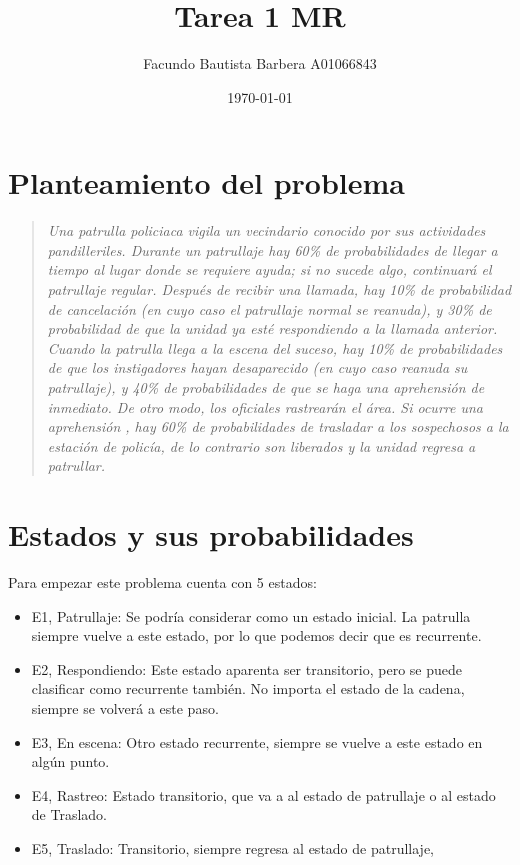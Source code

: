 \documentclass{article}
\title{Tarea 1 MR}
\author{Facundo Bautista Barbera A01066843}
\date{\today}
\begin{document}
\maketitle

\section*{Planteamiento del problema}

\begin{quote}
	\itshape
	Una patrulla policiaca vigila un vecindario conocido por sus actividades pandilleriles.
	Durante un patrullaje hay 60\% de probabilidades  de llegar a tiempo al lugar  donde se requiere ayuda; si no sucede algo, continuará el patrullaje regular.
	Después de recibir una llamada, hay 10\% de probabilidad de cancelación (en cuyo caso el patrullaje normal se reanuda), y 30\% de probabilidad de que la unidad ya esté respondiendo a la llamada anterior.
	Cuando la patrulla llega a la escena del suceso, hay 10\% de probabilidades de que los instigadores hayan desaparecido (en cuyo caso reanuda su patrullaje), y 40\% de probabilidades de que se haga una aprehensión de inmediato.
	De otro modo, los oficiales rastrearán el área.
	Si ocurre una aprehensión , hay 60\% de probabilidades de trasladar a los sospechosos a la estación de policía, de lo contrario son liberados y la unidad regresa a patrullar.
\end{quote}

\section*{Estados y sus probabilidades}

Para empezar este problema cuenta con 5 estados:
\begin{itemize}
	\item E1, Patrullaje: Se podría considerar como un estado inicial. La patrulla siempre vuelve a este estado, por lo que podemos decir que es recurrente.
	\item E2, Respondiendo: Este estado aparenta ser transitorio, pero se puede clasificar como recurrente también. No importa el estado de la cadena, siempre se volverá a este paso.
	\item E3, En escena: Otro estado recurrente, siempre se vuelve a este estado en algún punto.
	\item E4, Rastreo: Estado transitorio, que va a al estado de patrullaje o al estado de Traslado.
	\item E5, Traslado: Transitorio, siempre regresa al estado de patrullaje,
\end{itemize}
\end{document}
